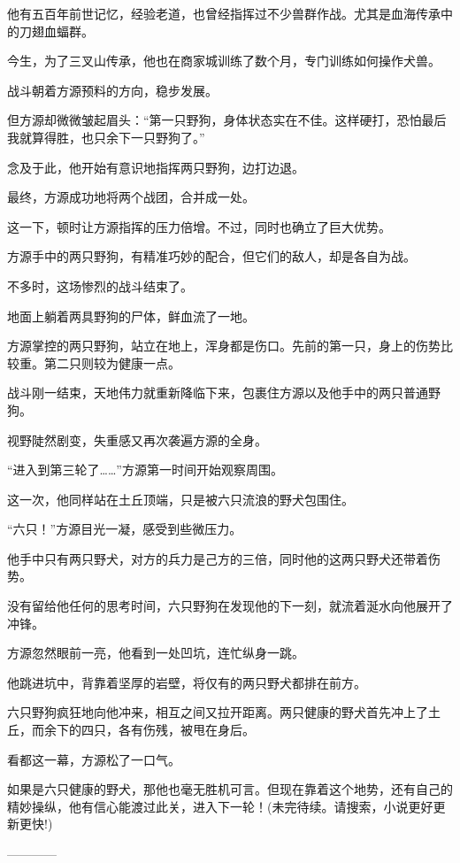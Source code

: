 \begin{this_body}
他有五百年前世记忆，经验老道，也曾经指挥过不少兽群作战。尤其是血海传承中的刀翅血蝠群。

今生，为了三叉山传承，他也在商家城训练了数个月，专门训练如何操作犬兽。

战斗朝着方源预料的方向，稳步发展。

但方源却微微皱起眉头：“第一只野狗，身体状态实在不佳。这样硬打，恐怕最后我就算得胜，也只余下一只野狗了。”

念及于此，他开始有意识地指挥两只野狗，边打边退。

最终，方源成功地将两个战团，合并成一处。

这一下，顿时让方源指挥的压力倍增。不过，同时也确立了巨大优势。

方源手中的两只野狗，有精准巧妙的配合，但它们的敌人，却是各自为战。

不多时，这场惨烈的战斗结束了。

地面上躺着两具野狗的尸体，鲜血流了一地。

方源掌控的两只野狗，站立在地上，浑身都是伤口。先前的第一只，身上的伤势比较重。第二只则较为健康一点。

战斗刚一结束，天地伟力就重新降临下来，包裹住方源以及他手中的两只普通野狗。

视野陡然剧变，失重感又再次袭遍方源的全身。

“进入到第三轮了……”方源第一时间开始观察周围。

这一次，他同样站在土丘顶端，只是被六只流浪的野犬包围住。

“六只！”方源目光一凝，感受到些微压力。

他手中只有两只野犬，对方的兵力是己方的三倍，同时他的这两只野犬还带着伤势。

没有留给他任何的思考时间，六只野狗在发现他的下一刻，就流着涎水向他展开了冲锋。

方源忽然眼前一亮，他看到一处凹坑，连忙纵身一跳。

他跳进坑中，背靠着坚厚的岩壁，将仅有的两只野犬都排在前方。

六只野狗疯狂地向他冲来，相互之间又拉开距离。两只健康的野犬首先冲上了土丘，而余下的四只，各有伤残，被甩在身后。

看都这一幕，方源松了一口气。

如果是六只健康的野犬，那他也毫无胜机可言。但现在靠着这个地势，还有自己的精妙操纵，他有信心能渡过此关，进入下一轮！(未完待续。请搜索，小说更好更新更快!)

------------

\end{this_body}

